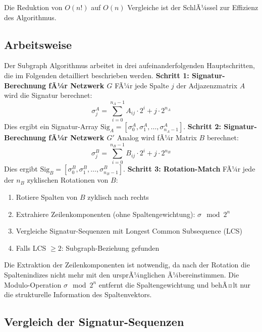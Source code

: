 ﻿\documentclass[a4paper,12pt]{article}
\theoremstyle{definition}
\begin{document}
Die Reduktion von $O(n!)$ auf $O(n)$ Vergleiche ist der SchlÃ¼ssel zur Effizienz des Algorithmus.

\subsection{Arbeitsweise}

Der Subgraph Algorithmus arbeitet in drei aufeinanderfolgenden Hauptschritten, die im Folgenden detailliert beschrieben werden.\newline\newline
\textbf{Schritt 1: Signatur-Berechnung fÃ¼r Netzwerk $G$}\newline
FÃ¼r jede Spalte $j$ der Adjazenzmatrix $A$ wird die Signatur berechnet:
\[
\sigma_j^A = \sum_{i=0}^{n_A-1} A_{ij} \cdot 2^i + j \cdot 2^{n_A}
\]
Dies ergibt ein Signatur-Array $\text{Sig}_A = [\sigma_0^A, \sigma_1^A, \ldots, \sigma_{n_A-1}^A]$.\newline\newline
\textbf{Schritt 2: Signatur-Berechnung fÃ¼r Netzwerk $G'$}\newline
Analog wird fÃ¼r Matrix $B$ berechnet:\newline
\[
\sigma_j^B = \sum_{i=0}^{n_B-1} B_{ij} \cdot 2^i + j \cdot 2^{n_B}
\]
Dies ergibt $\text{Sig}_B = [\sigma_0^B, \sigma_1^B, \ldots, \sigma_{n_B-1}^B]$.\newline\newline
\textbf{Schritt 3: Rotation-Match}\newline
FÃ¼r jede der $n_B$ zyklischen Rotationen von $B$:
\begin{enumerate}
	\item Rotiere Spalten von $B$ zyklisch nach rechts
	\item Extrahiere Zeilenkomponenten (ohne Spaltengewichtung): $\sigma \mod 2^n$
	\item Vergleiche Signatur-Sequenzen mit Longest Common Subsequence (LCS)
	\item Falls LCS $\geq 2$: Subgraph-Beziehung gefunden
\end{enumerate}
Die Extraktion der Zeilenkomponenten ist notwendig, da nach der Rotation die Spaltenindizes nicht mehr mit den ursprÃ¼nglichen Ã¼bereinstimmen. Die Modulo-Operation $\sigma \mod 2^n$ entfernt die Spaltengewichtung und behÃ¤lt nur die strukturelle Information des Spaltenvektors.

\subsection{Vergleich der Signatur-Sequenzen}
\end{document}
